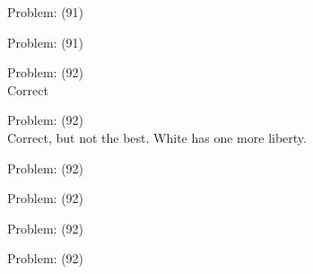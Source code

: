 \documentclass[11pt]{article}
\begin{document}
\begin{minipage}[t]{0.5\textwidth}
  {\centering
  
Problem: (91)\\
  }
\end{minipage}
\begin{minipage}[t]{0.5\textwidth}
  {\centering
  
Problem: (91)\\
  }
\end{minipage}
\begin{minipage}[t]{0.5\textwidth}
  {\centering
  
Problem: (92)\\
Correct\\
  }
\end{minipage}
\begin{minipage}[t]{0.5\textwidth}
  {\centering
  
Problem: (92)\\
Correct, but not the best. White has one more liberty.\\
  }
\end{minipage}
\begin{minipage}[t]{0.5\textwidth}
  {\centering
  
Problem: (92)\\
  }
\end{minipage}
\begin{minipage}[t]{0.5\textwidth}
  {\centering
  
Problem: (92)\\
  }
\end{minipage}
\begin{minipage}[t]{0.5\textwidth}
  {\centering
  
Problem: (92)\\
  }
\end{minipage}
\begin{minipage}[t]{0.5\textwidth}
  {\centering
  
Problem: (92)\\
  }
\end{minipage}
\end{document}
